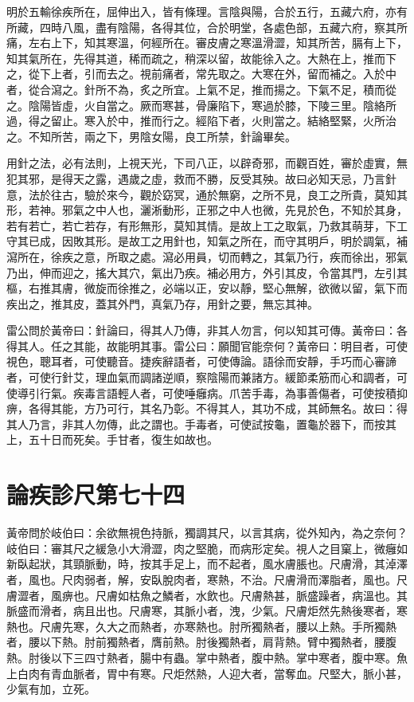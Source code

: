 明於五輸徐疾所在，屈伸出入，皆有條理。言陰與陽，合於五行，五藏六府，亦有所藏，四時八風，盡有陰陽，各得其位，合於明堂，各處色部，五藏六府，察其所痛，左右上下，知其寒溫，何經所在。審皮膚之寒溫滑澀，知其所苦，膈有上下，知其氣所在，先得其道，稀而疏之，稍深以留，故能徐入之。大熱在上，推而下之，從下上者，引而去之。視前痛者，常先取之。大寒在外，留而補之。入於中者，從合瀉之。針所不為，炙之所宜。上氣不足，推而揚之。下氣不足，積而從之。陰陽皆虛，火自當之。厥而寒甚，骨廉陷下，寒過於膝，下陵三里。陰絡所過，得之留止。寒入於中，推而行之。經陷下者，火則當之。結絡堅緊，火所治之。不知所苦，兩之下，男陰女陽，良工所禁，針論畢矣。

用針之法，必有法則，上視天光，下司八正，以辟奇邪，而觀百姓，審於虛實，無犯其邪，是得天之露，遇歲之虛，救而不勝，反受其殃。故曰必知天忌，乃言針意，法於往古，驗於來今，觀於窈冥，通於無窮，之所不見，良工之所貴，莫知其形，若神。邪氣之中人也，灑淅動形，正邪之中人也微，先見於色，不知於其身，若有若亡，若亡若存，有形無形，莫知其情。是故上工之取氣，乃救其萌芽，下工守其已成，因敗其形。是故工之用針也，知氣之所在，而守其明戶，明於調氣，補瀉所在，徐疾之意，所取之處。瀉必用員，切而轉之，其氣乃行，疾而徐出，邪氣乃出，伸而迎之，搖大其穴，氣出乃疾。補必用方，外引其皮，令當其門，左引其樞，右推其膚，微旋而徐推之，必端以正，安以靜，堅心無解，欲微以留，氣下而疾出之，推其皮，蓋其外門，真氣乃存，用針之要，無忘其神。

雷公問於黃帝曰：針論曰，得其人乃傳，非其人勿言，何以知其可傳。黃帝曰：各得其人。任之其能，故能明其事。雷公曰：願聞官能奈何？黃帝曰：明目者，可使視色，聰耳者，可使聽音。捷疾辭語者，可使傳論。語徐而安靜，手巧而心審諦者，可使行針艾，理血氣而調諸逆順，察陰陽而兼諸方。緩節柔筋而心和調者，可使導引行氣。疾毒言語輕人者，可使唾癰病。爪苦手毒，為事善傷者，可使按積抑痹，各得其能，方乃可行，其名乃彰。不得其人，其功不成，其師無名。故曰：得其人乃言，非其人勿傳，此之謂也。手毒者，可使試按龜，置龜於器下，而按其上，五十日而死矣。手甘者，復生如故也。



\section{論疾診尺第七十四}

黃帝問於岐伯曰：余欲無視色持脈，獨調其尺，以言其病，從外知內，為之奈何？岐伯曰：審其尺之緩急小大滑澀，肉之堅脆，而病形定矣。視人之目窠上，微癰如新臥起狀，其頸脈動，時，按其手足上，而不起者，風水膚脹也。尺膚滑，其淖澤者，風也。尺肉弱者，解，安臥脫肉者，寒熱，不治。尺膚滑而澤脂者，風也。尺膚澀者，風痹也。尺膚如枯魚之鱗者，水飲也。尺膚熱甚，脈盛躁者，病溫也。其脈盛而滑者，病且出也。尺膚寒，其脈小者，洩，少氣。尺膚炬然先熱後寒者，寒熱也。尺膚先寒，久大之而熱者，亦寒熱也。肘所獨熱者，腰以上熱。手所獨熱者，腰以下熱。肘前獨熱者，膺前熱。肘後獨熱者，肩背熱。臂中獨熱者，腰腹熱。肘後以下三四寸熱者，腸中有蟲。掌中熱者，腹中熱。掌中寒者，腹中寒。魚上白肉有青血脈者，胃中有寒。尺炬然熱，人迎大者，當奪血。尺堅大，脈小甚，少氣有加，立死。

